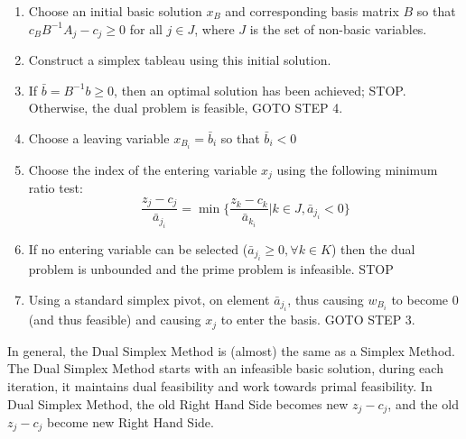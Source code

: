             \begin{enumerate}
                \item Choose an initial basic solution $x_B$ and corresponding basis matrix $B$ so that $c_BB^{-1}A_j - c_j \ge 0$ for all $j \in J$, where $J$ is the set of non-basic variables.
                \item Construct a simplex tableau using this initial solution.
                \item If $\bar{b} = B^{-1}b \ge 0$, then an optimal solution has been achieved; STOP. Otherwise, the dual problem is feasible, GOTO STEP 4.
                \item Choose a leaving variable $x_{B_i} = \bar{b}_i$ so that $\bar{b}_i < 0$
                \item Choose the index of the entering variable $x_j$ using the following minimum ratio test:
                \begin{equation*}
                    \frac{z_j - c_j}{\bar{a}_{j_i}} = \min \{\frac{z_k - c_k}{\bar{a}_{k_i}}|k \in J, \bar{a}_{j_i} < 0\}
                \end{equation*}
                \item If no entering variable can be selected ($\bar{a}_{j_i} \ge 0, \forall k \in K$) then the dual problem is unbounded and the prime problem is infeasible. STOP
                \item Using a standard simplex pivot, on element $\bar{a}_{j_i}$, thus causing $w_{B_i}$ to become 0 (and thus feasible) and causing $x_j$ to enter the basis. GOTO STEP 3.
            \end{enumerate}

            In general, the Dual Simplex Method is (almost) the same as a Simplex Method. The Dual Simplex Method starts with an infeasible basic solution, during each iteration, it maintains dual feasibility and work towards primal feasibility. In Dual Simplex Method, the old Right Hand Side becomes new $z_j - c_j$, and the old $z_j - c_j$ become new Right Hand Side.

